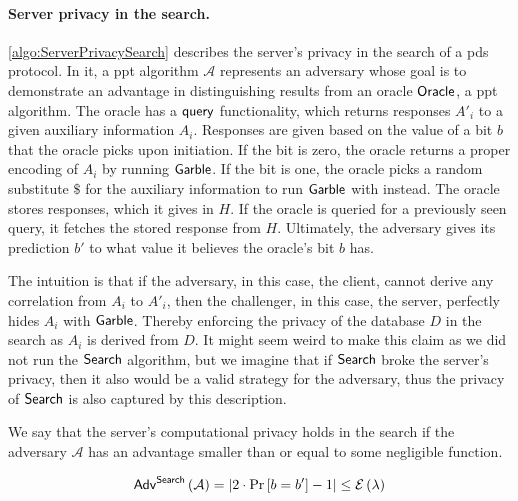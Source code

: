 \paragraph*{Server privacy in the search.}
\cref{algo:ServerPrivacySearch} describes the server's privacy in the search of a \acrshort{pds} protocol. In it, a \acrshort{ppt} algorithm $ \mathcal{A} $ represents an adversary whose goal is to demonstrate an advantage in distinguishing results from an oracle $ \mathsf{{Oracle}} $, a \acrshort{ppt} algorithm. The oracle has a $ \mathsf{{query}} $ functionality, which returns responses $ A'_i $ to a given auxiliary information $ A_i $. Responses are given based on the value of a bit $ b $ that the oracle picks upon initiation. If the bit is zero, the oracle returns a proper encoding of $ A_i $ by running $ \mathsf{{Garble}} $. If the bit is one, the oracle picks a random substitute $ \$ $ for the auxiliary information to run $ \mathsf{{Garble}} $ with instead. The oracle stores responses, which it gives in $ H $. If the oracle is queried for a previously seen query, it fetches the stored response from $ H $. Ultimately, the adversary gives its prediction $ b' $ to what value it believes the oracle's bit $ b $ has.

The intuition is that if the adversary, in this case, the client, cannot derive any correlation from $ A_i $ to $ A'_i $, then the challenger, in this case, the server, perfectly hides $ A_i $ with $ \mathsf{{Garble}} $. Thereby enforcing the privacy of the database $ D $ in the search as $ A_i $ is derived from $ D $. It might seem weird to make this claim as we did not run the $ \mathsf{{Search}} $ algorithm, but we imagine that if $ \mathsf{{Search}} $ broke the server's privacy, then it also would be a valid strategy for the adversary, thus the privacy of $ \mathsf{{Search}} $ is also captured by this description.

We say that the server's computational privacy holds in the search if the adversary $ \mathcal{A} $ has an advantage smaller than or equal to some negligible function.

\begin{equation*}
    \mathsf{{Adv}}^{\mathsf{{Search}}} \left( \mathcal{A} \right) = \left| 2 \cdot \Pr \left[ b = b' \right] - 1 \right| \leq \mathcal{E} \left( \lambda \right)
\end{equation*}

